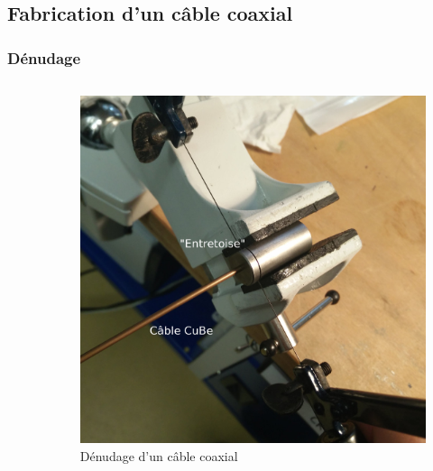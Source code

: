 \documentclass[8pt,a9paper]{beamer} \usepackage[utf8]{inputenc} \usepackage[francais]{babel} \usepackage[T1]{fontenc}
\begin{document}
\subsection{Fabrication d'un câble coaxial}
\begin{frame}
\frametitle{Dénudage}
\begin{columns}
\begin{column}{0.5\textwidth}
    \begin{description}
        \item[]~\\
    \end{description}
\end{column}
\begin{column}{0.5\textwidth}
\begin{figure}[h]
    \begin{center}
        \includegraphics[width=\textwidth]{Images/Coax/1}
        \caption{Dénudage d'un câble coaxial}
    \end{center}
\end{figure}
\end{column}
\end{columns}
\end{frame}
\end{document}
